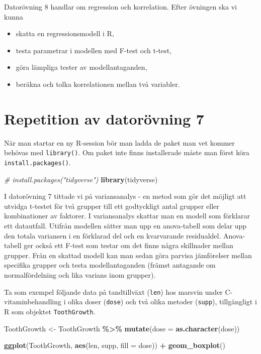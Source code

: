 \documentclass[
]{book}
\newenvironment{Shaded}{\begin{snugshade}}{\end{snugshade}}
\newcommand{\AttributeTok}[1]{\textcolor[rgb]{0.13,0.29,0.53}{#1}}
\newcommand{\CommentTok}[1]{\textcolor[rgb]{0.56,0.35,0.01}{\textit{#1}}}
\newcommand{\FunctionTok}[1]{\textcolor[rgb]{0.13,0.29,0.53}{\textbf{#1}}}
\newcommand{\NormalTok}[1]{#1}
\newcommand{\OtherTok}[1]{\textcolor[rgb]{0.56,0.35,0.01}{#1}}
\newcommand{\SpecialCharTok}[1]{\textcolor[rgb]{0.81,0.36,0.00}{\textbf{#1}}}
\theoremstyle{definition}
\theoremstyle{definition}
\theoremstyle{definition}
\theoremstyle{definition}
\theoremstyle{remark}
\begin{document}
Datorövning 8 handlar om regression och korrelation. Efter övningen ska vi kunna

\begin{itemize}
\item
  skatta en regressionsmodell i R,
\item
  testa parametrar i modellen med F-test och t-test,
\item
  göra lämpliga tester av modellantaganden,
\item
  beräkna och tolka korrelationen mellan två variabler.
\end{itemize}

\hypertarget{repetition-av-datoruxf6vning-7}{%
\section{Repetition av datorövning 7}\label{repetition-av-datoruxf6vning-7}}

När man startar en ny R-session bör man ladda de paket man vet kommer behövas med \texttt{library()}. Om paket inte finns installerade måste man först köra \texttt{install.packages()}.

\begin{Shaded}
\begin{Highlighting}[]
\CommentTok{\# install.packages("tidyverse")}
\FunctionTok{library}\NormalTok{(tidyverse)}
\end{Highlighting}
\end{Shaded}

I datorövning 7 tittade vi på variansanalys - en metod som gör det möjligt att utvidga t-testet för två grupper till ett godtyckligt antal grupper eller kombinationer av faktorer. I variansanalys skattar man en modell som förklarar ett datautfall. Utifrån modellen sätter man upp en anova-tabell som delar upp den totala variansen i en förklarad del och en kvarvarande residualdel. Anova-tabell ger också ett F-test som testar om det finns några skillnader mellan grupper. Från en skattad modell kan man sedan göra parvisa jämförelser mellan specifika grupper och testa modellantaganden (främst antagande om normalfördelning och lika varians inom grupper).

Ta som exempel följande data på tandtillväxt (\texttt{len}) hos marsvin under C-vitaminbehandling i olika doser (\texttt{dose}) och två olika metoder (\texttt{supp}), tillgängligt i R som objektet \texttt{ToothGrowth}.

\begin{Shaded}
\begin{Highlighting}[]
\NormalTok{ToothGrowth }\OtherTok{\textless{}{-}}\NormalTok{ ToothGrowth }\SpecialCharTok{\%\textgreater{}\%} \FunctionTok{mutate}\NormalTok{(}\AttributeTok{dose =} \FunctionTok{as.character}\NormalTok{(dose))}

\FunctionTok{ggplot}\NormalTok{(ToothGrowth, }\FunctionTok{aes}\NormalTok{(len, supp, }\AttributeTok{fill =}\NormalTok{ dose)) }\SpecialCharTok{+} 
  \FunctionTok{geom\_boxplot}\NormalTok{()}
\end{Highlighting}
\end{Shaded}
\end{document}
